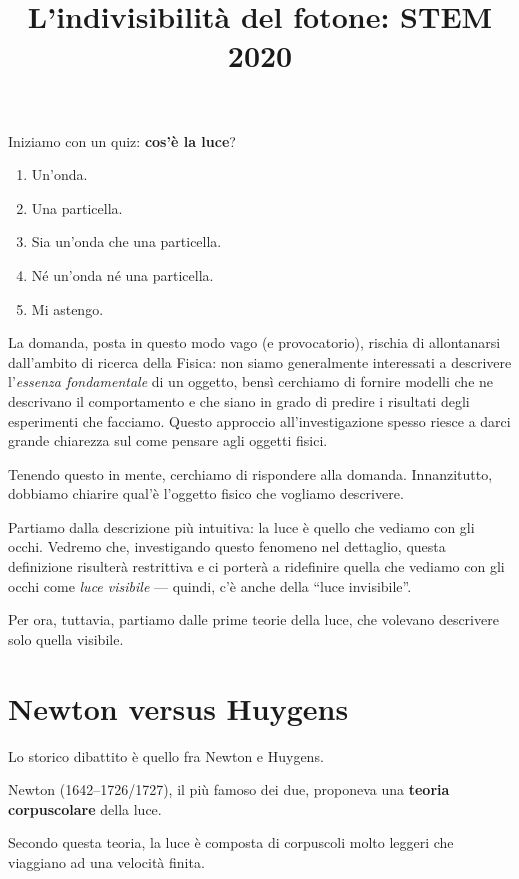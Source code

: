 \documentclass{article}
\title{L'indivisibilità del fotone: STEM 2020}
\begin{document}
\maketitle

Iniziamo con un quiz: \textbf{cos'è la luce}?

\begin{enumerate}[label=\emph{\alph*})]
    \item Un'onda.
    \item Una particella.
    \item Sia un'onda che una particella. 
    \item Né un'onda né una particella. 
    \item Mi astengo.
\end{enumerate}

La domanda, posta in questo modo vago (e provocatorio), rischia di allontanarsi dall'ambito di ricerca della Fisica: non siamo generalmente interessati a descrivere l'\emph{essenza fondamentale} di un oggetto, bensì cerchiamo di fornire modelli che ne descrivano il comportamento e che siano in grado di predire i risultati degli esperimenti che facciamo. 
Questo approccio all'investigazione spesso riesce a darci grande chiarezza sul come pensare agli oggetti fisici. 


Tenendo questo in mente, cerchiamo di rispondere alla domanda.
Innanzitutto, dobbiamo chiarire qual'è l'oggetto fisico che vogliamo descrivere.

Partiamo dalla descrizione più intuitiva: la luce è quello che vediamo con gli occhi. 
Vedremo che, investigando questo fenomeno nel dettaglio, questa definizione risulterà restrittiva e ci porterà a ridefinire quella che vediamo con gli occhi come \emph{luce visibile} --- quindi, c'è anche della ``luce invisibile''.

Per ora, tuttavia, partiamo dalle prime teorie della luce, che volevano descrivere solo quella visibile.

\section{Newton versus Huygens}

Lo storico dibattito è quello fra Newton e Huygens. 

Newton (1642--1726/1727), il più famoso dei due, proponeva una \textbf{teoria corpuscolare} della luce. 

Secondo questa teoria, la luce è composta di corpuscoli molto leggeri che viaggiano ad una velocità finita. 
\end{document}
